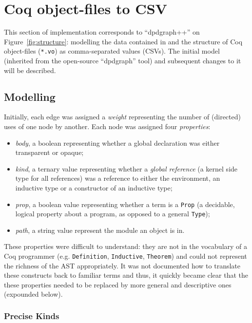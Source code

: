 \section{Coq object-files to CSV}

This section of implementation corresponds to ``dpdgraph++'' on
Figure~\ref{fig:structure}: modelling the data contained in and the structure
of Coq object-files (\texttt{*.vo}) as comma-separated values (CSVs). The
initial model (inherited from the open-source ``dpdgraph'' tool) and subsequent
changes to it will be described.

\subsection{Modelling}

Initially, each edge was assigned a \emph{weight} representing the number of
(directed) uses of one node by another. Each node was assigned four
\emph{properties}: 

\begin{itemize}
  \item \emph{body}, a boolean representing whether a global declaration was
    either transparent or opaque;
  
  \item \emph{kind}, a ternary value representing whether a \emph{global
    reference} (a kernel side type for all references) was a reference to either
    the environment, an inductive type or a constructor of an inductive type;

  \item \emph{prop}, a boolean value representing whether a term is a \texttt{Prop}
    (a decidable, logical property about a program, as opposed to a
    general \texttt{Type});

  \item \emph{path}, a string value represent the module an object is in.
\end{itemize}

These properties were difficult to understand: they are not in the
vocabulary of a Coq programmer (e.g. \texttt{Definition}, \texttt{Inductive},
\texttt{Theorem}) and could not represent the richness of the
AST appropriately. It was not documented how to translate these constructs back
to familiar terms and thus, it quickly became clear that the these properties
needed to be replaced by more general and descriptive ones (expounded below).

\subsubsection{Precise Kinds}\label{subsubsec:kinds}

